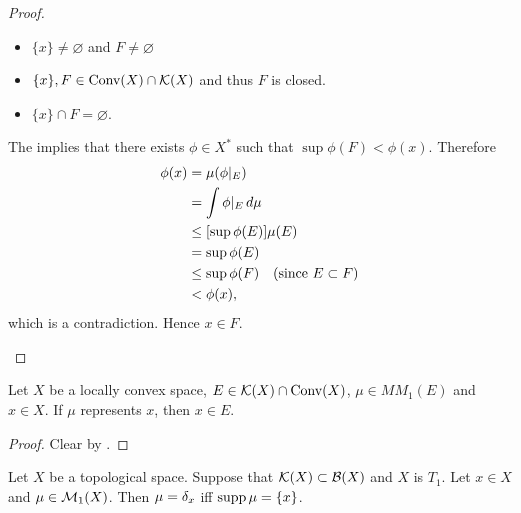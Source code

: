 \documentclass{book}
\begin{document}
\begin{proof}
\begin{itemize}
\begin{itemize}
				\item $\{x\} \neq \varnothing$ and $F \neq \varnothing$
				\item $\{x\}, F \in \text{Conv}(X) \cap \mathcal{K}(X)$ and thus $F$ is closed.
				\item $\{x\} \cap F = \varnothing$.
			\end{itemize}
			The  implies that there exists $\phi \in X^*$ such that $\sup \phi(F) < \phi(x)$. Therefore 
			\begin{align*}
				\phi(x)
				& = \mu(\phi|_E) \\
				& = \int \phi|_E \, d \mu \\
				& \leq [\sup \phi(E)] \mu(E) \\
				& = \sup \phi(E) \\
				& \leq \sup \phi(F) \quad \text{(since $E \subset F$)} \\
				& < \phi(x), 
			\end{align*}
			which is a contradiction. Hence $x \in F$. 
		\end{itemize}
	\end{proof}
	
	\begin{ex}
		Let $X$ be a locally convex space, $E \in \mathcal{K}(X) \cap \text{Conv}(X)$, $\mu \in MM_1(E)$ and $x \in X$. If $\mu$ represents $x$, then $x \in E$. 
	\end{ex}
	
	\begin{proof}
		Clear by .
	\end{proof}
	
	\begin{ex}  
		Let $X$ be a topological space. Suppose that $\mathcal{K}(X) \subset \mathcal{B}(X)$ and $X$ is $T_1$. Let $x \in X$ and $\mu \in \mathcal{M}_1(X)$. Then $\mu = \delta_x$ iff $\operatorname{supp} \mu = \{x\}$. 
	\end{ex}
	
\end{document}
